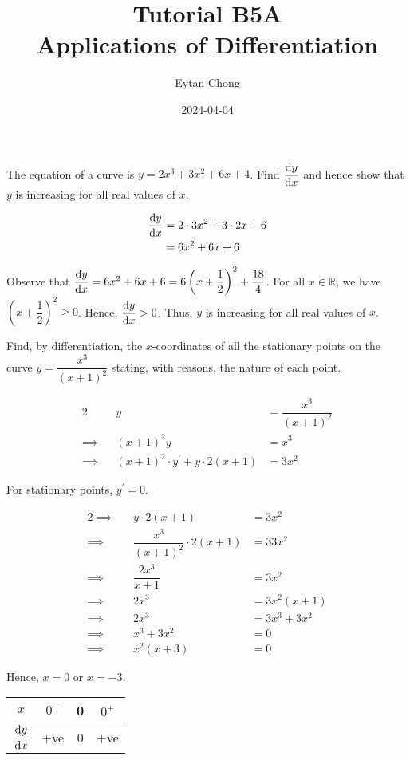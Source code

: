 \documentclass{echw}
\title{Tutorial B5A\\Applications of Differentiation}
\author{Eytan Chong}
\date{2024-04-04}
\begin{document}
    \problem{}
        The equation of a curve is $y=2x^3+3x^2+6x+4$. Find $\dfrac{\mathrm{d} y}{\mathrm{d} x}$ and hence show that $y$ is increasing for all real values of $x$.

    \solution
        \begin{align*}
            \dfrac{\mathrm{d} y}{\mathrm{d} x} &= 2\cdot3x^2 + 3 \cdot2x + 6\\
            &= 6x^2+6x+6
        \end{align*}


        Observe that $\dfrac{\mathrm{d} y}{\mathrm{d} x} = 6x^2 + 6x+6 = 6\left(x + \dfrac12\right)^2 + \dfrac{18}4$. For all $x \in \mathbb{R}$, we have $\left(x + \dfrac12\right)^2 \geq 0$. Hence, $\dfrac{\mathrm{d} y}{\mathrm{d} x} > 0$. Thus, $y$ is increasing for all real values of $x$.

    \problem{}
        Find, by differentiation, the $x$-coordinates of all the stationary points on the curve $y = \dfrac{x^3}{(x+1)^2}$ stating, with reasons, the nature of each point.

    \solution
        \begin{alignat*}{2}
            &&y &= \dfrac{x^3}{(x+1)^2}\\
            \implies&&(x+1)^2y&=x^3\\
            \implies&&(x+1)^2\cdot y^\prime + y\cdot2(x+1) &= 3x^2
        \end{alignat*}

        For stationary points, $y^\prime = 0$.

        \begin{alignat*}{2}
            \implies&&y\cdot2(x+1) &= 3x^2\\
            \implies&&\dfrac{x^3}{(x+1)^2}\cdot2(x+1) &=3 3x^2\\
            \implies&&\dfrac{2x^3}{x+1} &= 3x^2\\
            \implies&&2x^3 &= 3x^2(x+1)\\
            \implies&&2x^3 &= 3x^3 + 3x^2\\
            \implies&&x^3+3x^2&=0\\
            \implies&&x^2(x+3)&=0
        \end{alignat*}

        Hence, $x = 0$ or $x = -3$.


        \begin{table}[h]
            \centering
            \begin{tabular}{|c|c|c|c|}
            \hline
            $x$          & $0^-$ & 0 & $0^+$ \\\hline
            $\dfrac{\mathrm{d} y}{\mathrm{d} x}$ & +ve   & 0 & +ve   \\[1ex]\hline
            \end{tabular}
        \end{table}
\end{document}

